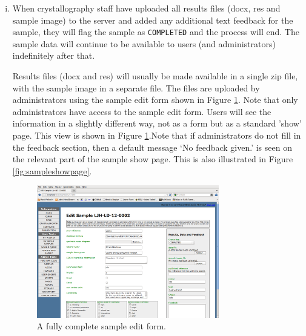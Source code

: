 \documentclass[12pt,twoside]{article}
\begin{document}
\begin{enumerate}[(i)]
\item
When crystallography staff have uploaded all results files (docx, res and
sample image) to the server and added any additional text feedback for
the sample, they will flag the sample as \verb=COMPLETED= and the process
will end. The sample data will continue to be available to users
(and administrators) indefinitely after that.

Results files (docx and res) will usually be made available in a single 
zip file, with
the sample image in a separate file. The files are uploaded by
administrators using the sample edit form shown in 
Figure \ref{fig:sampleeditform}. Note that only administrators have access
to the sample edit form.
Users will see the information in a slightly different way, not as a form
but as a standard 'show' page. This view is shown in
Figure \ref{fig:sampleeditform}.Note that if administrators do not fill in the feedback section, then a
default message `No feedback given.' is seen on the relevant part of the
sample show page. This is also illustrated in 
Figure \ref{fig:sampleshowpage}.

\begin{figure}[!htb]
\begin{center}
\includegraphics[width=0.75\textwidth]{sampleeditform}
\caption{A fully complete sample edit form.\label{fig:sampleeditform}}
\end{center}
\end{figure}


\end{enumerate}
\end{document}
